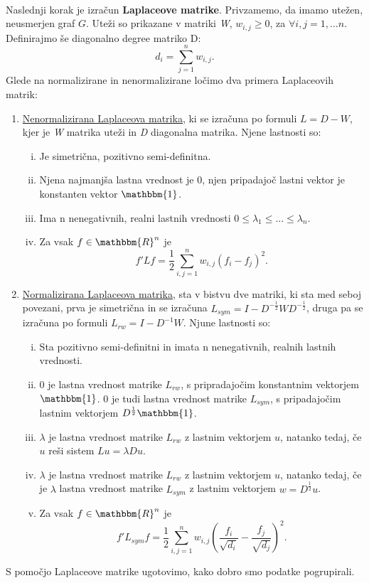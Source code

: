\documentclass[a4paper, 10pt]{article}
\begin{document}
\\
Naslednji korak je izračun \textbf{Laplaceove matrike}. Privzamemo, da imamo utežen, neusmerjen graf $G$. Uteži so prikazane v matriki \textsl{W}, $w_{i,j} \geq 0$, za $\forall i,j = 1, ... n$. Definirajmo še diagonalno degree matriko D: $$ d_i = \sum_{j=1}^n w_{i,j}.$$Glede na normalizirane in nenormalizirane ločimo dva primera Laplaceovih matrik:\\
\begin{enumerate}
\item\underline{Nenormalizirana Laplaceova matrika}, ki se izračuna po formuli $L = D - W$, kjer je \textsl{W} matrika uteži in \textsl{D} diagonalna matrika. Njene lastnosti so:
\begin{enumerate}[i)]
  \item Je simetrična, pozitivno semi-definitna.
  \item Njena najmanjša lastna vrednost je 0, njen pripadajoč lastni vektor je konstanten vektor $\mathbbm{1}$.
  \item Ima n nenegativnih, realni lastnih vrednosti $0 \leq \lambda_1 \leq ... \leq \lambda_n$.
  \item Za vsak $f \in\mathbbm{R}^n$ je $$f'Lf= \frac{1}{2} \sum_{i,j=1}^n w_{i,j}(f_i - f_j)^2.$$
\end{enumerate}

\item\underline{Normalizirana Laplaceova matrika}, sta v bistvu dve matriki, ki sta med seboj povezani, prva je simetrična in se izračuna $L_{sym} = I - D^{-\frac{1}{2}}WD^{-\frac{1}{2}}$, druga pa se izračuna po formuli $L_{rw} = I - D^{-1}W$.
Njune lastnosti so:
\begin{enumerate}[i)]
  \item Sta pozitivno semi-definitni in imata n nenegativnih, realnih lastnih vrednosti.
  \item 0 je lastna vrednost matrike $L_{rw}$, s pripradajočim konstantnim vektorjem $\mathbbm{1}$. 0 je tudi lastna vrednost matrike $L_{sym}$, s pripadajočim lastnim vektorjem $D^\frac{1}{2}\mathbbm{1}$.
  \item $\lambda$ je lastna vrednost matrike $L_{rw}$ z lastnim vektorjem $u$, natanko tedaj, če $u$ reši sistem $Lu = \lambda Du$.
  \item $\lambda$ je lastna vrednost matrike $L_{rw}$ z lastnim vektorjem $u$, natanko tedaj, če je $\lambda$ lastna vrednost matrike $L_{sym}$ z lastnim vektorjem $w = D^\frac{1}{2}u$.
  \item Za vsak  $f \in\mathbbm{R}^n$ je $$f'L_{sym}f= \frac{1}{2} \sum_{i,j=1}^n w_{i,j}(\frac{f_i}{\sqrt{d_i}} - \frac{f_j}{\sqrt{d_j}})^2.$$
\end{enumerate}
\end{enumerate}
S pomočjo Laplaceove matrike ugotovimo, kako dobro smo podatke pogrupirali.
\end{document}
